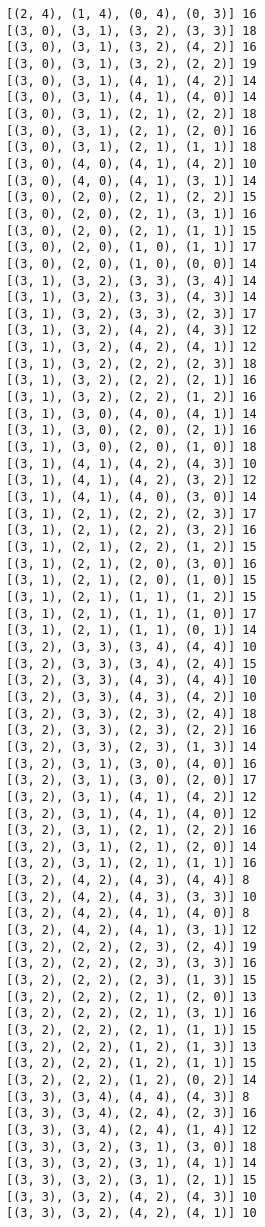 \documentclass[11pt]{article}
\begin{document}
\begin{Verbatim}[commandchars=\\\{\}]
[(2, 4), (1, 4), (0, 4), (0, 3)] 16
[(3, 0), (3, 1), (3, 2), (3, 3)] 18
[(3, 0), (3, 1), (3, 2), (4, 2)] 16
[(3, 0), (3, 1), (3, 2), (2, 2)] 19
[(3, 0), (3, 1), (4, 1), (4, 2)] 14
[(3, 0), (3, 1), (4, 1), (4, 0)] 14
[(3, 0), (3, 1), (2, 1), (2, 2)] 18
[(3, 0), (3, 1), (2, 1), (2, 0)] 16
[(3, 0), (3, 1), (2, 1), (1, 1)] 18
[(3, 0), (4, 0), (4, 1), (4, 2)] 10
[(3, 0), (4, 0), (4, 1), (3, 1)] 14
[(3, 0), (2, 0), (2, 1), (2, 2)] 15
[(3, 0), (2, 0), (2, 1), (3, 1)] 16
[(3, 0), (2, 0), (2, 1), (1, 1)] 15
[(3, 0), (2, 0), (1, 0), (1, 1)] 17
[(3, 0), (2, 0), (1, 0), (0, 0)] 14
[(3, 1), (3, 2), (3, 3), (3, 4)] 14
[(3, 1), (3, 2), (3, 3), (4, 3)] 14
[(3, 1), (3, 2), (3, 3), (2, 3)] 17
[(3, 1), (3, 2), (4, 2), (4, 3)] 12
[(3, 1), (3, 2), (4, 2), (4, 1)] 12
[(3, 1), (3, 2), (2, 2), (2, 3)] 18
[(3, 1), (3, 2), (2, 2), (2, 1)] 16
[(3, 1), (3, 2), (2, 2), (1, 2)] 16
[(3, 1), (3, 0), (4, 0), (4, 1)] 14
[(3, 1), (3, 0), (2, 0), (2, 1)] 16
[(3, 1), (3, 0), (2, 0), (1, 0)] 18
[(3, 1), (4, 1), (4, 2), (4, 3)] 10
[(3, 1), (4, 1), (4, 2), (3, 2)] 12
[(3, 1), (4, 1), (4, 0), (3, 0)] 14
[(3, 1), (2, 1), (2, 2), (2, 3)] 17
[(3, 1), (2, 1), (2, 2), (3, 2)] 16
[(3, 1), (2, 1), (2, 2), (1, 2)] 15
[(3, 1), (2, 1), (2, 0), (3, 0)] 16
[(3, 1), (2, 1), (2, 0), (1, 0)] 15
[(3, 1), (2, 1), (1, 1), (1, 2)] 15
[(3, 1), (2, 1), (1, 1), (1, 0)] 17
[(3, 1), (2, 1), (1, 1), (0, 1)] 14
[(3, 2), (3, 3), (3, 4), (4, 4)] 10
[(3, 2), (3, 3), (3, 4), (2, 4)] 15
[(3, 2), (3, 3), (4, 3), (4, 4)] 10
[(3, 2), (3, 3), (4, 3), (4, 2)] 10
[(3, 2), (3, 3), (2, 3), (2, 4)] 18
[(3, 2), (3, 3), (2, 3), (2, 2)] 16
[(3, 2), (3, 3), (2, 3), (1, 3)] 14
[(3, 2), (3, 1), (3, 0), (4, 0)] 16
[(3, 2), (3, 1), (3, 0), (2, 0)] 17
[(3, 2), (3, 1), (4, 1), (4, 2)] 12
[(3, 2), (3, 1), (4, 1), (4, 0)] 12
[(3, 2), (3, 1), (2, 1), (2, 2)] 16
[(3, 2), (3, 1), (2, 1), (2, 0)] 14
[(3, 2), (3, 1), (2, 1), (1, 1)] 16
[(3, 2), (4, 2), (4, 3), (4, 4)] 8
[(3, 2), (4, 2), (4, 3), (3, 3)] 10
[(3, 2), (4, 2), (4, 1), (4, 0)] 8
[(3, 2), (4, 2), (4, 1), (3, 1)] 12
[(3, 2), (2, 2), (2, 3), (2, 4)] 19
[(3, 2), (2, 2), (2, 3), (3, 3)] 16
[(3, 2), (2, 2), (2, 3), (1, 3)] 15
[(3, 2), (2, 2), (2, 1), (2, 0)] 13
[(3, 2), (2, 2), (2, 1), (3, 1)] 16
[(3, 2), (2, 2), (2, 1), (1, 1)] 15
[(3, 2), (2, 2), (1, 2), (1, 3)] 13
[(3, 2), (2, 2), (1, 2), (1, 1)] 15
[(3, 2), (2, 2), (1, 2), (0, 2)] 14
[(3, 3), (3, 4), (4, 4), (4, 3)] 8
[(3, 3), (3, 4), (2, 4), (2, 3)] 16
[(3, 3), (3, 4), (2, 4), (1, 4)] 12
[(3, 3), (3, 2), (3, 1), (3, 0)] 18
[(3, 3), (3, 2), (3, 1), (4, 1)] 14
[(3, 3), (3, 2), (3, 1), (2, 1)] 15
[(3, 3), (3, 2), (4, 2), (4, 3)] 10
[(3, 3), (3, 2), (4, 2), (4, 1)] 10

\end{Verbatim}
\end{document}
